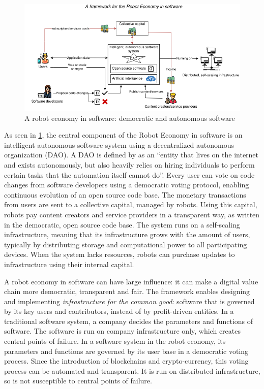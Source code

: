 \begin{figure}
    \centering
    \includegraphics[width=1\textwidth]{introduction/robot-economy-3.png}
    \caption{A robot economy in software: democratic and autonomous software}
    \label{fig:robot-economy-in-software}
\end{figure}

As seen in \ref{fig:robot-economy-in-software}, the central component of the Robot Economy in software is an intelligent autonomous software system using a decentralized autonomous organization (DAO). A DAO is defined by \cite{buterin2014dao} as an ``entity that lives on the internet and exists autonomously, but also heavily relies on hiring individuals to perform certain tasks that the automation itself cannot do''. Every user can vote on code changes from software developers using a democratic voting protocol, enabling continuous evolution of an open source code base. The monetary transactions from users are sent to a collective capital, managed by robots. Using this capital, robots pay content creators and service providers in a transparent way, as written in the democratic, open source code base. The system runs on a self-scaling infrastructure, meaning that its infrastructure grows with the amount of users, typically by distributing storage and computational power to all participating devices. When the system lacks resources, robots can purchase updates to infrastructure using their internal capital.

A robot economy in software can have large influence: it can make a digital value chain more democratic, transparent and fair. The framework enables designing and implementing \textit{infrastructure for the common good}: software that is governed by its key users and contributors, instead of by profit-driven entities. In a traditional software system, a company decides the parameters and functions of software. The software is run on company infrastructure only, which creates central points of failure. In a software system in the robot economy, its parameters and functions are governed by its user base in a democratic voting process. Since the introduction of blockchains and crypto-currency, this voting process can be automated and transparent. It is run on distributed infrastructure, so is not susceptible to central points of failure.

